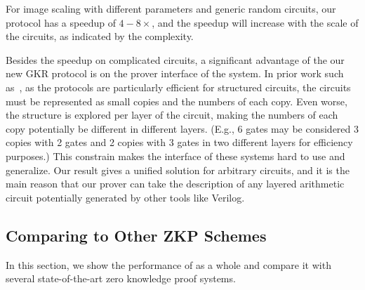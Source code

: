 For image scaling with different parameters and generic random circuits, our protocol has a speedup of $4-8\times$, and the speedup will increase with the scale of the circuits, as indicated by the complexity.

Besides the speedup on complicated circuits, a significant advantage of the our new GKR protocol is on the prover interface of the system. In prior work such as~\cite{wahby2017full,vram}, as the protocols are particularly efficient for structured circuits, the circuits must be represented as small copies and the numbers of each copy. Even worse, the structure is explored per layer of the circuit, making the numbers of each copy potentially be different in different layers. (E.g., 6 gates may be considered 3 copies with 2 gates and 2 copies with 3 gates in two different layers for efficiency purposes.) This constrain makes the interface of these systems hard to use and generalize. Our result gives a unified solution for arbitrary circuits, and it is the main reason that our prover can take the description of any layered arithmetic circuit potentially generated by other tools like Verilog. 


\subsection{Comparing to Other ZKP Schemes}\label{subsec:expZKP}

In this section, we show the performance of \name as a whole and compare it with several state-of-the-art zero knowledge proof systems.

